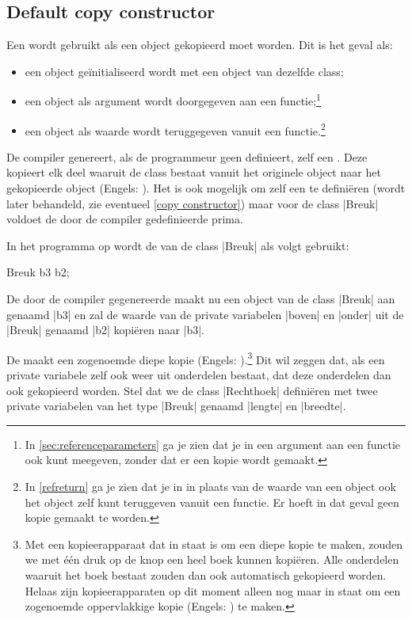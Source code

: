 \begin{cpplstShortInline}
\section{Default copy constructor}
\label{sec:defaultcopyconstructor}
Een  wordt gebruikt als een object gekopieerd moet worden. Dit is het geval als:
\begin{itemize}
    \item een object geïnitialiseerd wordt met een object van dezelfde class;
    \item een object als argument wordt doorgegeven aan een functie;\footnote{In \cref{sec:referenceparameters} ga je zien dat je in \Cpp{} een argument aan een functie ook kunt meegeven, zonder dat er een kopie wordt gemaakt.}
    \item een object als waarde wordt teruggegeven vanuit een functie.\footnote{In \cref{refreturn} ga je zien dat je in \Cpp{} in plaats van de waarde van een object ook het object zelf kunt teruggeven vanuit een functie. Er hoeft in dat geval geen kopie gemaakt te worden.}
\end{itemize}

De compiler genereert, als de programmeur geen  definieert, zelf een \emph{}. 
Deze  kopieert elk deel waaruit de class bestaat vanuit het originele object naar het gekopieerde object (Engels: \emph{}). 
Het is ook mogelijk om zelf een  te definiëren (wordt later behandeld, zie eventueel \cref{copy constructor}) maar voor de class |Breuk| voldoet de door de compiler gedefinieerde  prima. 

In het programma op  wordt de  van de class |Breuk| als volgt gebruikt:

\begin{cpplstfragment}
    Breuk b3 {b2};
\end{cpplstfragment}

De door de compiler gegenereerde  maakt nu een object van de class |Breuk| aan genaamd |b3| en zal de waarde van de private variabelen |boven| en |onder| uit de |Breuk| genaamd |b2| kopiëren naar |b3|.

De  maakt een zogenoemde diepe kopie (Engels: ).\footnote{%
    Met een kopieerapparaat dat in staat is om een diepe kopie te maken, zouden we met één druk op de knop een heel boek kunnen kopiëren. Alle onderdelen waaruit het boek bestaat zouden dan ook automatisch gekopieerd worden. Helaas zijn kopieerapparaten op dit moment alleen nog maar in staat om een zogenoemde oppervlakkige kopie (Engels: ) te maken. 
} Dit wil zeggen dat, als een private variabele zelf ook weer uit onderdelen bestaat, dat deze onderdelen dan ook gekopieerd worden. Stel dat we de class |Rechthoek| definiëren met twee private variabelen van het type |Breuk| genaamd |lengte| en |breedte|. 


\end{cpplstShortInline}
